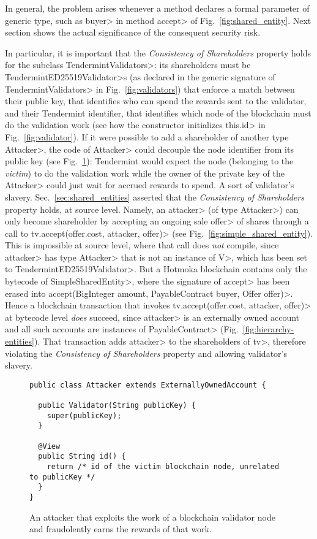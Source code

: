 In general, the problem arises whenever a method declares a formal parameter of generic type,
such as \<buyer> in method \<accept> of Fig.~\ref{fig:shared_entity}. Next section shows
the actual significance of the consequent security risk.

In particular, it is important that the \emph{Consistency of Shareholders} property holds
for the subclass \<TendermintValidators>: its shareholders
must be \<TendermintED25519Validator>s (as declared in the generic
signature of \<TendermintValidators> in Fig.~\ref{fig:validators}) that enforce a
match between their public key, that identifies who can spend the rewards sent to the validator,
and their Tendermint identifier, that identifies which node of the blockchain
must do the validation work (see how the constructor initializes \<this.id> in
Fig.~\ref{fig:validator}).
If it were possible to add a shareholder of another
type \<Attacker>, the code of \<Attacker> could decouple the node identifier from its
public key (see Fig.~\ref{fig:attacker}):
Tendermint would expect the node (belonging to the \emph{victim}) to do
the validation work while the owner
of the private key of the \<Attacker> could just wait for accrued rewards to spend.
A sort of validator's slavery.
Sec.~\ref{sec:shared_entities} asserted that the \emph{Consistency of Shareholders}
property holds, at source level.
Namely, an \<attacker> (of type \<Attacker>) can only become shareholder
by accepting an ongoing sale \<offer> of shares through a call to
\<tv.accept(offer.cost, attacker, offer)> (see Fig.~\ref{fig:simple_shared_entity}).
This is impossible at source level, where that call does \emph{not} compile, since \<attacker> has type \<Attacker> that
is not an instance of \<V>, which has been set to \<TendermintED25519Validator>.
But a Hotmoka blockchain contains only the bytecode of \<SimpleSharedEntity>,
where the signature of \<accept> has been erased into
\<accept(BigInteger amount, PayableContract buyer, Offer offer)>.
Hence a blockchain transaction that invokes \<tv.accept(offer.cost, attacker, offer)>
at bytecode level
\emph{does} succeed, since \<attacker> is an externally owned account and all such accounts
are instances of \<PayableContract> (Fig.~\ref{fig:hierarchy-entities}).
That transaction adds \<attacker> to the shareholders of \<tv>,
therefore violating the \emph{Consistency of Shareholders} property and allowing
validator's slavery.

\begin{figure}[t]
  \begin{center}
    \begin{lstlisting}[language=Takamaka]
public class Attacker extends ExternallyOwnedAccount {

  public Validator(String publicKey) {
    super(publicKey);
  }

  @View
  public String id() {
    return /* id of the victim blockchain node, unrelated to publicKey */
  }
}
    \end{lstlisting}
  \end{center}
  \caption{An attacker that exploits the work of a blockchain validator node and fraudolently earns the rewards of that work.}\label{fig:attacker}
\end{figure}

